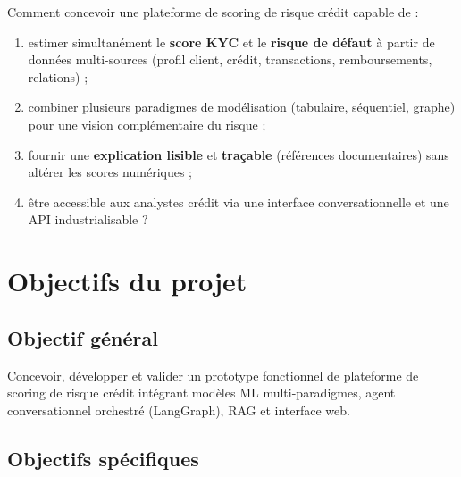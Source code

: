 Comment concevoir une plateforme de scoring de risque crédit capable de :
\begin{enumerate}[leftmargin=*]
  \item estimer simultanément le \textbf{score KYC} et le \textbf{risque de défaut} à partir de données multi-sources (profil client, crédit, transactions, remboursements, relations) ;
  \item combiner plusieurs paradigmes de modélisation (tabulaire, séquentiel, graphe) pour une vision complémentaire du risque ;
  \item fournir une \textbf{explication lisible} et \textbf{traçable} (références documentaires) sans altérer les scores numériques ;
  \item être accessible aux analystes crédit via une interface conversationnelle et une API industrialisable ?
\end{enumerate}

\section{Objectifs du projet}

\subsection{Objectif général}

Concevoir, développer et valider un prototype fonctionnel de plateforme de scoring de risque crédit intégrant modèles ML multi-paradigmes, agent conversationnel orchestré (LangGraph), RAG et interface web.

\subsection{Objectifs spécifiques}

